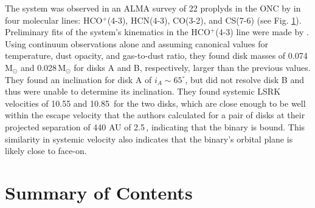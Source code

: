 \begin{figure}[htp]
  \hspace*{\fill}%
  \hfill%
  \vfill%
  \hfill%
  \hfill%
  \hspace*{\fill}%
  \label{fig:data_moment_maps}
\end{figure}

The system was observed in an ALMA survey of 22 proplyds in the ONC by \citet{Mann2014} in four molecular lines: HCO$^+$(4-3), HCN(4-3), CO(3-2), and CS(7-6) (see Fig. \ref{fig:data_moment_maps}). Preliminary fits of the system's kinematics in the HCO$^+$(4-3) line were made by \citet{Williams2014}. Using continuum observations alone and assuming canonical values for temperature, dust opacity, and gas-to-dust ratio, they found disk masses of 0.074\,M$_{\odot}$ and 0.028\,M$_{\odot}$ for disks A and B, respectively, larger than the previous values. They found an inclination for disk A of $i_A \sim 65^\circ$, but did not resolve disk B and thus were unable to determine its inclination. They found systemic LSRK velocities of 10.55 and 10.85\,\kms{}  for the two disks, which are close enough to be well within the escape velocity that the authors calculated for a pair of disks at their projected separation of 440 AU of 2.5\,\kms, indicating that the binary is bound. This similarity in systemic velocity also indicates that the binary's orbital plane is likely close to face-on.



\section{Summary of Contents}

